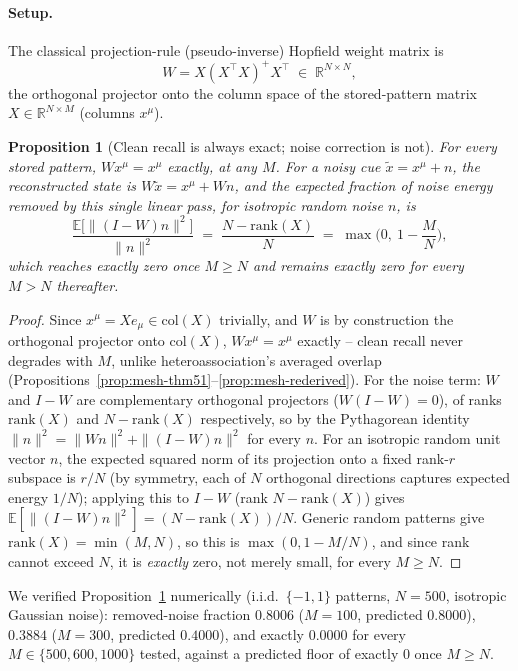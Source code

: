 \documentclass[11pt]{article}
\newtheorem{proposition}{Proposition}
\begin{document}
\paragraph{Setup.} The classical projection-rule (pseudo-inverse) Hopfield weight matrix is
\[
W = X(X^\top X)^+X^\top \;\in\; \mathbb{R}^{N\times N},
\]
the orthogonal projector onto the column space of the stored-pattern matrix
$X\in\mathbb{R}^{N\times M}$ (columns $x^\mu$).

\begin{proposition}[Clean recall is always exact; noise correction is not]
\label{prop:hopfield-wall}
For every stored pattern, $Wx^\mu = x^\mu$ exactly, at any $M$. For a noisy cue
$\tilde x=x^\mu+n$, the reconstructed state is $W\tilde x = x^\mu + Wn$, and the expected fraction
of noise energy \emph{removed} by this single linear pass, for isotropic random noise $n$, is
\[
\frac{\mathbb{E}\big[\|(I-W)n\|^2\big]}{\|n\|^2} \;=\; \frac{N-\mathrm{rank}(X)}{N} \;=\; \max\!\Big(0,\ 1-\frac{M}{N}\Big),
\]
which reaches exactly zero once $M\ge N$ and remains exactly zero for every $M>N$ thereafter.
\end{proposition}

\begin{proof}
Since $x^\mu=Xe_\mu\in\mathrm{col}(X)$ trivially, and $W$ is by construction the orthogonal
projector onto $\mathrm{col}(X)$, $Wx^\mu=x^\mu$ exactly -- clean recall never degrades with $M$,
unlike heteroassociation's averaged overlap (Propositions~\ref{prop:mesh-thm51}--\ref{prop:mesh-rederived}).
For the noise term: $W$ and $I-W$ are complementary orthogonal projectors ($W(I-W)=0$), of ranks
$\mathrm{rank}(X)$ and $N-\mathrm{rank}(X)$ respectively, so by the Pythagorean identity
$\|n\|^2=\|Wn\|^2+\|(I-W)n\|^2$ for every $n$. For an isotropic random unit vector $n$, the
expected squared norm of its projection onto a fixed rank-$r$ subspace is $r/N$ (by symmetry,
each of $N$ orthogonal directions captures expected energy $1/N$); applying this to $I-W$
(rank $N-\mathrm{rank}(X)$) gives $\mathbb{E}[\|(I-W)n\|^2]=(N-\mathrm{rank}(X))/N$. Generic random
patterns give $\mathrm{rank}(X)=\min(M,N)$, so this is $\max(0,1-M/N)$, and since rank cannot
exceed $N$, it is \emph{exactly} zero, not merely small, for every $M\ge N$.
\end{proof}

We verified Proposition~\ref{prop:hopfield-wall} numerically (i.i.d.\ $\{-1,1\}$ patterns,
$N{=}500$, isotropic Gaussian noise): removed-noise fraction $0.8006$ ($M{=}100$, predicted
$0.8000$), $0.3884$ ($M{=}300$, predicted $0.4000$), and exactly $0.0000$ for every
$M\in\{500,600,1000\}$ tested, against a predicted floor of exactly $0$ once $M\ge N$.
\end{document}
